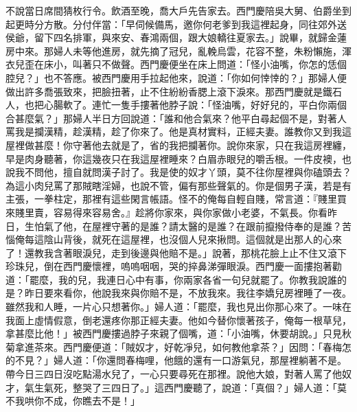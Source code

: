 不說當日席間猜枚行令。飲酒至晚，喬大戶先告家去。西門慶陪吳大舅、伯爵坐到起更時分方散。分付伴當：「早伺候備馬，邀你何老爹到我這裡起身，同往郊外送侯爺，留下四名排軍，與來安、春鴻兩個，跟大娘轎往夏家去。」說畢，就歸金蓮房中來。那婦人未等他進房，就先摘了冠兒，亂輓烏雲，花容不整，朱粉懶施，渾衣兒歪在床小，叫著只不做聲。西門慶便坐在床上問道：「怪小油嘴，你怎的恁個腔兒？」也不答應。被西門慶用手拉起他來，說道：「你如何悻悻的？」那婦人便做出許多喬張致來，把臉扭著，止不住紛紛香腮上滾下淚來。那西門慶就是鐵石人，也把心腸軟了。連忙一隻手摟著他脖子說：「怪油嘴，好好兒的，平白你兩個合甚麼氣？」那婦人半日方回說道：「誰和他合氣來？他平白尋起個不是，對著人罵我是攔漢精，趁漢精，趁了你來了。他是真材實料，正經夫妻。誰教你又到我這屋裡做甚麼！你守著他去就是了，省的我把攔著你。說你來家，只在我這房裡纏，早是肉身聽著，你這幾夜只在我這屋裡睡來？白眉赤眼兒的嚼舌根。一件皮襖，也說我不問他，擅自就問漢子討了。我是使的奴才丫頭，莫不往你屋裡與你磕頭去？為這小肉兒罵了那賊瞎淫婦，也說不管，偏有那些聲氣的。你是個男子漢，若是有主張，一拳柱定，那裡有這些閑言帳語。怪不的俺每自輕自賤，常言道：『賤里買來賤里賣，容易得來容易舍。』趁將你家來，與你家做小老婆，不氣長。你看昨日，生怕氣了他，在屋裡守著的是誰？請太醫的是誰？在跟前攛撥侍奉的是誰？苦惱俺每這陰山背後，就死在這屋裡，也沒個人兒來揪問。這個就是出那人的心來了！還教我含著眼淚兒，走到後邊與他賠不是。」說著，那桃花臉上止不住又滾下珍珠兒，倒在西門慶懷裡，嗚嗚咽咽，哭的捽鼻涕彈眼淚。西門慶一面摟抱著勸道：「罷麼，我的兒，我連日心中有事，你兩家各省一句兒就罷了。你教我說誰的是？昨日要來看你，他說我來與你賠不是，不放我來。我往李嬌兒房裡睡了一夜。雖然我和人睡，一片心只想著你。」婦人道：「罷麼，我也見出你那心來了。一味在我面上虛情假意，倒老還疼你那正經夫妻。他如今替你懷著孩子，俺每一根草兒，拿甚麼比他！」被西門慶摟過脖子來親了個嘴，道：「小油嘴，休要胡說。」只見秋菊拿進茶來。西門慶便道：「賊奴才，好乾凈兒，如何教他拿茶？」因問：「春梅怎的不見？」婦人道：「你還問春梅哩，他餓的還有一口游氣兒，那屋裡躺著不是。帶今日三四日沒吃點湯水兒了，一心只要尋死在那裡。說他大娘，對著人罵了他奴才，氣生氣死，整哭了三四日了。」這西門慶聽了，說道：「真個？」婦人道：「莫不我哄你不成，你瞧去不是！」

